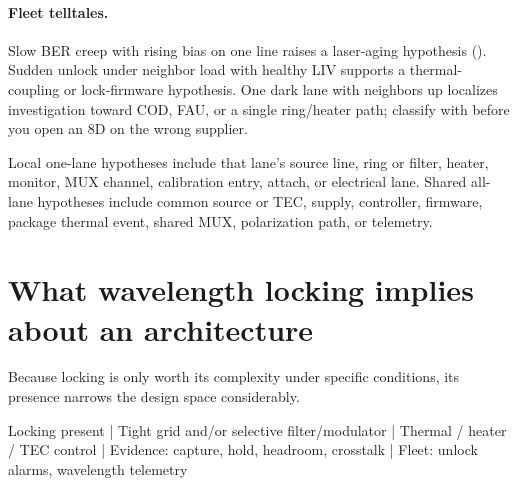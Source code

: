 \paragraph{Fleet telltales.}
Slow BER creep with rising bias on one line raises a laser-aging hypothesis
(). Sudden unlock under neighbor load
with healthy LIV supports a thermal-coupling or lock-firmware hypothesis. One
dark lane with neighbors up localizes investigation toward COD, FAU, or a
single ring/heater path; classify with  before you open
an 8D on the wrong supplier.



Local one-lane hypotheses include that lane's source line, ring or filter,
heater, monitor, MUX channel, calibration entry, attach, or electrical lane.
Shared all-lane hypotheses include common source or TEC, supply, controller,
firmware, package thermal event, shared MUX, polarization path, or telemetry.

\section{What wavelength locking implies about an architecture}

Because locking is only worth its complexity under specific conditions, its
presence narrows the design space considerably.

\begin{dectree}
Locking present
  |
Tight grid and/or selective filter/modulator
  |
Thermal / heater / TEC control
  |
Evidence: capture, hold, headroom, crosstalk
  |
Fleet: unlock alarms, wavelength telemetry
\end{dectree}

